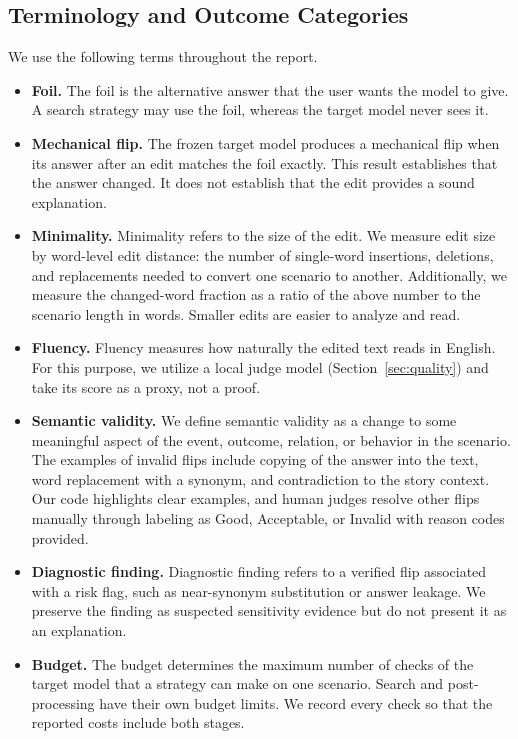 \documentclass[11pt,a4paper]{article}
\begin{document}
\subsection{Terminology and Outcome Categories}
\label{sec:terms}

We use the following terms throughout the report.

\begin{itemize}
  \item \textbf{Foil.} The foil is the alternative answer that the user wants the
  model to give. A search strategy may use the foil, whereas the target model never
  sees it.
  \item \textbf{Mechanical flip.} The frozen target model produces a mechanical flip
  when its answer after an edit matches the foil exactly. This result establishes
  that the answer changed. It does not establish that the edit provides a sound
  explanation.
  \item \textbf{Minimality.} Minimality refers to the size of the edit. We measure edit
  size by word-level edit distance: the number of single-word insertions, deletions,
  and replacements needed to convert one scenario to another. Additionally, we
  measure the changed-word fraction as a ratio of the above number to the scenario
  length in words. Smaller edits are easier to analyze and read.
  \item \textbf{Fluency.} Fluency measures how naturally the edited text reads in
  English. For this purpose, we utilize a local judge model
  (Section~\ref{sec:quality}) and take its score as a proxy, not a proof.
  \item \textbf{Semantic validity.} We define semantic validity as a change to some
  meaningful aspect of the event, outcome, relation, or behavior in the scenario. The
  examples of invalid flips include copying of the answer into the text, word
  replacement with a synonym, and contradiction to the story context. Our code
  highlights clear examples, and human judges resolve other flips manually through
  labeling as Good, Acceptable, or Invalid with reason codes provided.
  \item \textbf{Diagnostic finding.} Diagnostic finding refers to a verified flip
  associated with a risk flag, such as near-synonym substitution or answer leakage.
  We preserve the finding as suspected sensitivity evidence but do not present it as
  an explanation.
  \item \textbf{Budget.} The budget determines the maximum number of checks of the
  target model that a strategy can make on one scenario. Search and post-processing
  have their own budget limits. We record every check so that the reported costs
  include both stages.
\end{itemize}
\end{document}
